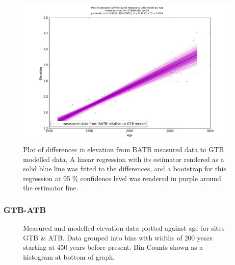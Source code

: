 \begin{figure}[H]
	\includegraphics[width=1.3\linewidth, angle=270 ]{data/bothNonZero/withinSeventyFivePercent/gias/theGIA_BATB_relative_to_GTB.png}
	\caption{Plot of differences in elevation from BATB measured data to GTB modelled data. A linear regression with its estimator rendered as
	 a solid blue line was fitted to the differences, and a bootstrap for this regression at 95 \% confidence level was rendered in purple
	 around the estimator line.}
	\label{fig:gias_BATBxGTB}
\end{figure}
\newpage







\subsubsection{GTB-ATB}

\begin{figure}[H]
	\caption{Measured and modelled elevation data plotted against age for sites GTB \& ATB. Data grouped into bins with widths of 200 years starting at 450 years before present. Bin Counts shown as a histogram at bottom of graph.}	
	\label{fig:data_GTBxATB}
\end{figure}

